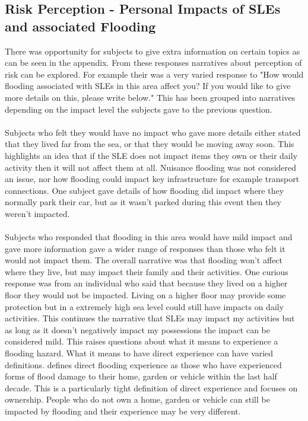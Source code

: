 \subsection{Risk Perception - Personal Impacts of SLEs and associated Flooding}
There was opportunity for subjects to give extra information on certain topics as can be seen in the appendix. From these responses narratives about perception of risk can be explored. For example their was a very varied response to "How would flooding associated with SLEs in this area affect you? If you would like to give more details on this, please write below." This has been grouped into narratives depending on the impact level the subjects gave to the previous question.
\paragraph{}

Subjects who felt they would have no impact who gave more details either stated that they lived far from the sea, or that they would be moving away soon. This highlights an idea that if the SLE does not impact items they own or their daily activity then it will not affect them at all. Nuisance flooding was not considered an issue, nor how flooding could impact key infrastructure for example transport connections. One subject gave details of how flooding did impact where they normally park their car, but as it wasn't parked during this event then they weren't impacted. 
\paragraph{}

Subjects who responded that flooding in this area would have mild impact and gave more information gave a wider range of responses than those who felt it would not impact them. The overall narrative was that flooding won’t affect where they live, but may impact their family and their activities. One curious response was from an individual who said that because they lived on a higher floor they would not be impacted. Living on a higher floor may provide some protection but in a extremely high sea level could still have impacts on daily activities. This continues the narrative that SLEs may impact my activities but as long as it doesn't negatively impact my possessions the impact can be considered mild. This raises questions about what it means to experience a flooding hazard. What it means to have direct experience can have varied definitions. 
\cite{whitmarsh_are_2008} defines direct flooding experience as those who have experienced forms of flood damage to their home, garden or vehicle within the last half decade. This is a particularly tight definition of direct experience and focuses on ownership. People who do not own a home, garden or vehicle can still be impacted by flooding and their experience may be very different.  
